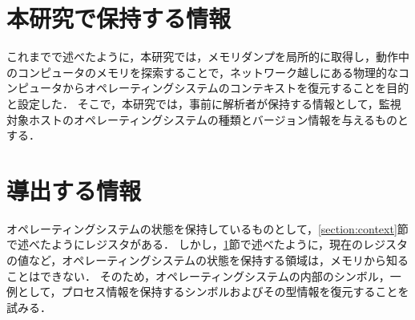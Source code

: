 
\section{本研究で保持する情報}
\label{section:info}

これまでで述べたように，本研究では，メモリダンプを局所的に取得し，動作中のコンピュータのメモリを探索することで，ネットワーク越しにある物理的なコンピュータからオペレーティングシステムのコンテキストを復元することを目的と設定した．
そこで，本研究では，事前に解析者が保持する情報として，監視対象ホストのオペレーティングシステムの種類とバージョン情報を与えるものとする．

\section{導出する情報}
\label{section:want}

オペレーティングシステムの状態を保持しているものとして，\ref{section:context}節で述べたようにレジスタがある．
しかし，\ref{section:info}節で述べたように，現在のレジスタの値など，オペレーティングシステムの状態を保持する領域は，メモリから知ることはできない．
そのため，オペレーティングシステムの内部のシンボル，一例として，プロセス情報を保持するシンボルおよびその型情報を復元することを試みる．
